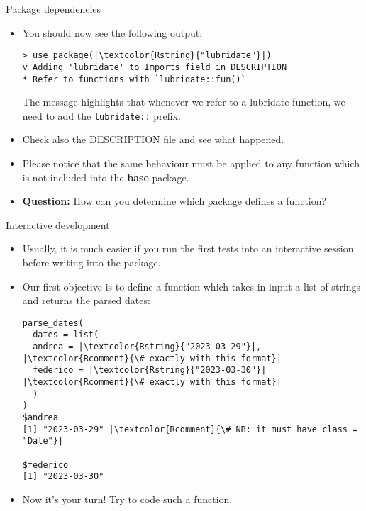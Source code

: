 \documentclass[
hyperref={bookmarks=false},
xcolor={dvipsnames,svgnames*,x11names*}, 
12pt
]{beamer}
\begin{document}
\begin{frame}[fragile]{Package dependencies}
\vspace{-0.5cm}
\begin{itemize}
\itemsep 2ex
\item You should now see the following output: 
\begin{lstlisting}
> use_package(|\textcolor{Rstring}{"lubridate"}|)
v Adding 'lubridate' to Imports field in DESCRIPTION
* Refer to functions with `lubridate::fun()`
\end{lstlisting}
The message highlights that whenever we refer to a lubridate function, we need to add the \texttt{lubridate::} prefix. 
		
\item Check also the DESCRIPTION file and see what happened. 
\item Please notice that the same behaviour must be applied to any function which is not included into the \textbf{base} package. 
\item \textbf{Question:} How can you determine which package defines a function? 
\end{itemize}
\end{frame}

\begin{frame}[fragile]{Interactive development}
\vspace{-0.5cm}
\begin{itemize}
\itemsep 2ex
\item Usually, it is much easier if you run the first tests into an interactive session before writing into the package. 
\item Our first objective is to define a function which takes in input a list of strings and returns the parsed dates:
\begin{lstlisting}
parse_dates(
  dates = list(
  andrea = |\textcolor{Rstring}{"2023-03-29"}|, |\textcolor{Rcomment}{\# exactly with this format}|
  federico = |\textcolor{Rstring}{"2023-03-30"}| |\textcolor{Rcomment}{\# exactly with this format}|
  )
)
$andrea
[1] "2023-03-29" |\textcolor{Rcomment}{\# NB: it must have class = "Date"}|
		
$federico
[1] "2023-03-30"
\end{lstlisting}
\item Now it's your turn! Try to code such a function. 
\end{itemize}
\end{frame}
\end{document}
